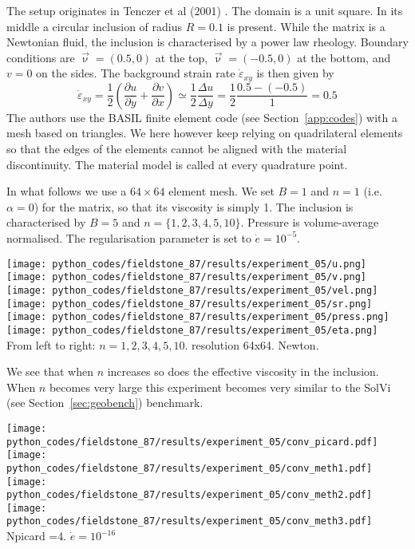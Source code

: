 The setup originates in Tenczer et al (2001) \cite{tesb01}. 
The domain is a unit square. In its middle a circular inclusion of radius $R=0.1$
is present. While the matrix is a Newtonian fluid, the inclusion is characterised
by a power law rheology. 
Boundary conditions are $\vec\upnu=(0.5,0)$ at the top, $\vec\upnu=(-0.5,0)$
at the bottom, and $v=0$ on the sides.
The background strain rate $\dot\varepsilon_{xy}$ is then given by
\[
\dot\varepsilon_{xy} = \frac{1}{2}\left( \frac{\partial u}{\partial y}+ \frac{\partial v}{\partial x} \right)
\simeq \frac{1}{2} \frac{\Delta u}{\Delta y}
= \frac{1}{2} \frac{0.5-(-0.5)}{1} = 0.5
\]
The authors use the BASIL finite element code (see Section~\ref{app:codes})
with a mesh based on triangles. We here however 
keep relying on quadrilateral elements so that the edges of the elements cannot be 
aligned with the material discontinuity. 
The material model is called at every quadrature point.  

In what follows we use a $64\times 64$ element mesh. 
We set $B=1$ and $n=1$ (i.e. $\alpha=0$) for the matrix, 
so that its viscosity is simply 1. The inclusion is characterised by $B=5$ and $n=\{1,2,3,4,5,10\}$.
Pressure is volume-average normalised. The regularisation parameter is set to $\dot{e}=10^{-5}$. 

\begin{center}
\texttt{[image: python\_codes/fieldstone\_87/results/experiment\_05/u.png]}
\texttt{[image: python\_codes/fieldstone\_87/results/experiment\_05/v.png]}\\
\texttt{[image: python\_codes/fieldstone\_87/results/experiment\_05/vel.png]}
\texttt{[image: python\_codes/fieldstone\_87/results/experiment\_05/sr.png]}\\
\texttt{[image: python\_codes/fieldstone\_87/results/experiment\_05/press.png]}
\texttt{[image: python\_codes/fieldstone\_87/results/experiment\_05/eta.png]}\\
{\captionfont From left to right: $n=1,2,3,4,5,10$. resolution 64x64. Newton.}
\end{center}

We see that when $n$ increases so does the effective viscosity in the inclusion. When 
$n$ becomes very large this experiment becomes very similar to the SolVi (see 
Section~\ref{sec:geobench}) benchmark.

\begin{center}
\texttt{[image: python\_codes/fieldstone\_87/results/experiment\_05/conv\_picard.pdf]}
\texttt{[image: python\_codes/fieldstone\_87/results/experiment\_05/conv\_meth1.pdf]}\\
\texttt{[image: python\_codes/fieldstone\_87/results/experiment\_05/conv\_meth2.pdf]}
\texttt{[image: python\_codes/fieldstone\_87/results/experiment\_05/conv\_meth3.pdf]}\\
{\captionfont Npicard =4. $\dot{e}=10^{-16}$}
\end{center}


